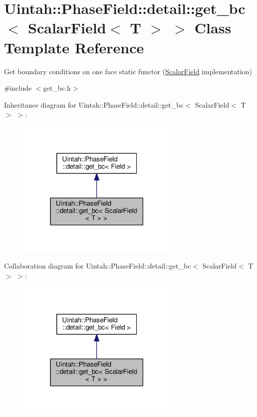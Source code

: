 \hypertarget{classUintah_1_1PhaseField_1_1detail_1_1get__bc_3_01ScalarField_3_01T_01_4_01_4}{}\section{Uintah\+:\+:Phase\+Field\+:\+:detail\+:\+:get\+\_\+bc$<$ Scalar\+Field$<$ T $>$ $>$ Class Template Reference}
\label{classUintah_1_1PhaseField_1_1detail_1_1get__bc_3_01ScalarField_3_01T_01_4_01_4}


Get boundary conditions on one face static functor (\hyperlink{structUintah_1_1PhaseField_1_1ScalarField}{Scalar\+Field} implementation)  




{\ttfamily \#include $<$get\+\_\+bc.\+h$>$}



Inheritance diagram for Uintah\+:\+:Phase\+Field\+:\+:detail\+:\+:get\+\_\+bc$<$ Scalar\+Field$<$ T $>$ $>$\+:\nopagebreak
\begin{figure}[H]
\begin{center}
\leavevmode
\includegraphics[width=219pt]{classUintah_1_1PhaseField_1_1detail_1_1get__bc_3_01ScalarField_3_01T_01_4_01_4__inherit__graph}
\end{center}
\end{figure}


Collaboration diagram for Uintah\+:\+:Phase\+Field\+:\+:detail\+:\+:get\+\_\+bc$<$ Scalar\+Field$<$ T $>$ $>$\+:\nopagebreak
\begin{figure}[H]
\begin{center}
\leavevmode
\includegraphics[width=219pt]{classUintah_1_1PhaseField_1_1detail_1_1get__bc_3_01ScalarField_3_01T_01_4_01_4__coll__graph}
\end{center}
\end{figure}
